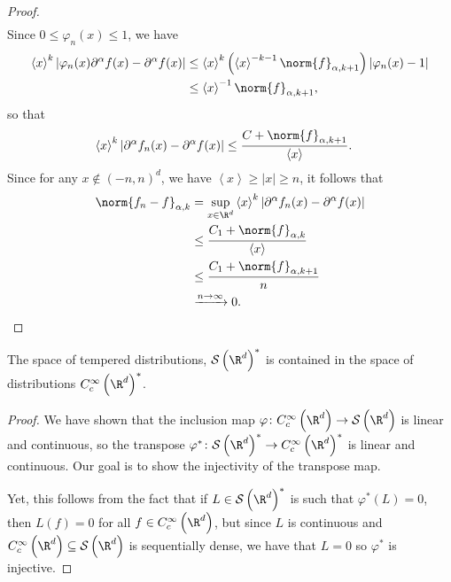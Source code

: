 \documentclass[10pt]{mypackage}
\begin{document}
\begin{proof}
\begin{align*}
  \end{align*}
  Since $0\leq \varphi_n(x) \leq 1$, we have
  \begin{align*}
    \left\langle x \right\rangle^{k} \left\vert \varphi_n(x)\partial^{\alpha}f(x) - \partial^{\alpha}f(x) \right\vert &\leq \left\langle x \right\rangle^{k} \left( \left\langle x \right\rangle^{-k-1}\norm{f}_{\alpha,k+1} \right)\left\vert \varphi_n(x)-1 \right\vert\\
                                                                                                                                           &\leq \left\langle x \right\rangle^{-1} \norm{f}_{\alpha,k+1},
  \end{align*}
  so that
  \begin{align*}
    \left\langle x \right\rangle^{k} \left\vert \partial^{\alpha}f_n(x) - \partial^{\alpha}f(x) \right\vert &\leq \frac{C + \norm{f}_{\alpha,k+1}}{\left\langle x \right\rangle}.
  \end{align*}
  Since for any $x\notin \left( -n,n \right)^{d}$, we have $\left\langle x \right\rangle\geq \left\vert x \right\vert\geq n$, it follows that
  \begin{align*}
    \norm{f_n-f}_{\alpha,k} &= \sup_{x\in \R^d} \left\langle x \right\rangle^{k} \left\vert \partial^{\alpha}f_n(x) - \partial^{\alpha}f(x) \right\vert\\
                            &\leq \frac{C_1 + \norm{f}_{\alpha,k}}{\left\langle x \right\rangle}\\
                            &\leq \frac{C_1 + \norm{f}_{\alpha,k+1}}{n}\\
                            &\xrightarrow{n\to\infty} 0.
  \end{align*}
\end{proof}
\begin{corollary}
  The space of tempered distributions, $\mathcal{S}\left( \R^d \right)^{\ast}$ is contained in the space of distributions $C_c^{\infty}\left( \R^d \right)^{\ast}$.
\end{corollary}
\begin{proof}
  We have shown that the inclusion map $\varphi\colon C_c^{\infty}\left( \R^d \right)\rightarrow \mathcal{S}\left( \R^d \right)$ is linear and continuous, so the transpose $\varphi^{\ast}\colon \mathcal{S}\left( \R^d \right)^{\ast}\to C_c^{\infty}\left( \R^d \right)^{\ast}$ is linear and continuous. Our goal is to show the injectivity of the transpose map.

  Yet, this follows from the fact that if $L\in \mathcal{S}\left( \R^d \right)^{\ast}$ is such that $\varphi^{\ast}\left( L \right) = 0$, then $L(f) = 0$ for all $f\in C_c^{\infty}\left( \R^d \right)$, but since $L$ is continuous and $C_c^{\infty}\left( \R^d \right)\subseteq \mathcal{S}\left( \R^d \right)$ is sequentially dense, we have that $L = 0$ so $\varphi^{\ast}$ is injective.
\end{proof}
\end{document}
